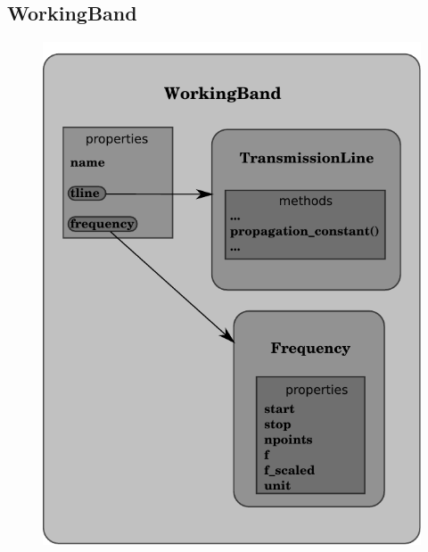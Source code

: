 \documentclass[letterpaper,10pt,english]{sphinxmanual}
\begin{document}
\subsection{WorkingBand}
\label{architecture:workingband}\begin{figure}[htbp]
\centering

\includegraphics{workingBand.pdf}
\end{figure}
\end{document}
